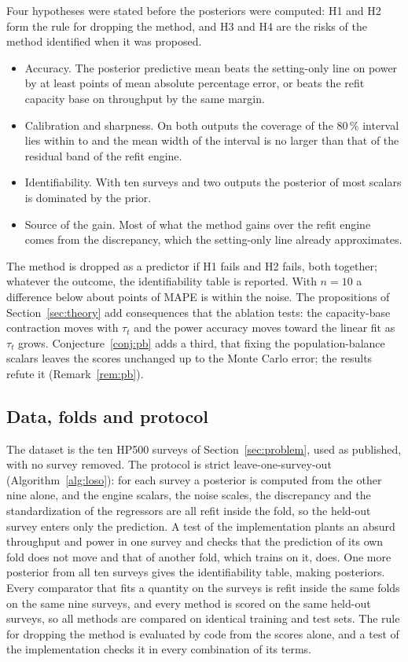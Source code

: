 \documentclass[journal]{IEEEtran}
\newcommand{\pct}{\,\%}
\begin{document}
Four hypotheses were stated before the posteriors were computed: H1 and H2 form the rule for dropping the method, and H3
and H4 are the risks of the method identified when it was proposed.
\begin{itemize}
\item[H1] Accuracy. The posterior predictive mean beats the setting-only line on power by at least \marginPts{} points of
mean absolute percentage error, or beats the refit capacity base on throughput by the same margin.
\item[H2] Calibration and sharpness. On both outputs the coverage of the 80\pct{} interval lies within \covLo{} to
\covHi{} and the mean width of the interval is no larger than that of the residual band of the refit engine.
\item[H3] Identifiability. With ten surveys and two outputs the posterior of most scalars is dominated by the prior.
\item[H4] Source of the gain. Most of what the method gains over the refit engine comes from the discrepancy, which the
setting-only line already approximates.
\end{itemize}
The method is dropped as a predictor if H1 fails and H2 fails, both together; whatever the outcome, the identifiability
table is reported. With $n=10$ a difference below about \marginPts{} points of MAPE is within the noise. The propositions of
Section~\ref{sec:theory} add consequences that the ablation tests: the capacity-base contraction moves with $\tau_t$ and
the power accuracy moves toward the linear fit as $\tau_t$ grows. Conjecture~\ref{conj:pb} adds a third, that fixing the
population-balance scalars leaves the scores unchanged up to the Monte Carlo error; the results refute it
(Remark~\ref{rem:pb}).

\subsection{Data, folds and protocol}

The dataset is the ten HP500 surveys of Section~\ref{sec:problem}, used as published, with no survey removed. The
protocol is strict leave-one-survey-out (Algorithm~\ref{alg:loso}): for each survey a posterior is computed from the other
nine alone, and the engine scalars, the noise scales, the discrepancy and the standardization of the regressors are all
refit inside the fold, so the held-out survey enters only the prediction. A test of the implementation plants an absurd
throughput and power in one survey and checks that the prediction of its own fold does not move and that of another
fold, which trains on it, does. One more posterior from all ten surveys gives the
identifiability table, making \nPosteriors{} posteriors. Every comparator that fits a quantity on the surveys is refit inside the
same folds on the same nine surveys, and every method is scored on the same held-out surveys, so all methods are compared
on identical training and test sets. The rule for dropping the method is evaluated
by code from the scores alone, and a test of the implementation checks it in every combination of its terms.
\end{document}
